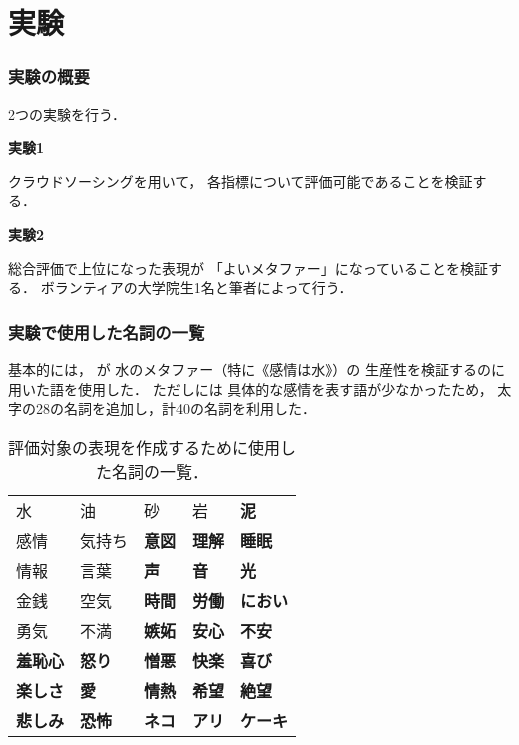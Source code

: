 \documentclass[12pt,usepdftitle=false]{beamer}
\begin{document}
\section{実験}
\begin{frame}
    \frametitle{実験の概要}

    2つの実験を行う．

    \bigskip

    \textbf{実験1}

    クラウドソーシングを用いて，
    各指標について評価可能であることを検証する．

    \bigskip

    \textbf{実験2}

    総合評価で上位になった表現が
    「よいメタファー」になっていることを検証する．
    ボランティアの大学院生1名と筆者によって行う．

\end{frame}

\begin{frame}
    \frametitle{実験で使用した名詞の一覧}
    基本的には，
    \citet{nabeshima2011}が
    水のメタファー（特に《感情は水》）の
    生産性を検証するのに用いた語を使用した．
    ただし\citet{nabeshima2011}には
    具体的な感情を表す語が少なかったため，
    太字の28の名詞を追加し，計40の名詞を利用した．

    \begin{table}
        \footnotesize
        \begin{tabular}{lllll}
            \toprule
            水 & 油 & 砂 & 岩 & \textbf{泥} \\
            感情 & 気持ち & \textbf{意図} & \textbf{理解} & \textbf{睡眠} \\
            情報 & 言葉 & \textbf{声} & \textbf{音} & \textbf{光} \\
            金銭 & 空気 & \textbf{時間} & \textbf{労働} & \textbf{におい} \\
            勇気 & 不満 & \textbf{嫉妬} & \textbf{安心} & \textbf{不安} \\
            \textbf{羞恥心}  & \textbf{怒り} & \textbf{憎悪} & \textbf{快楽} & \textbf{喜び} \\
            \textbf{楽しさ} & \textbf{愛} & \textbf{情熱} & \textbf{希望} & \textbf{絶望} \\
            \textbf{悲しみ} & \textbf{恐怖} & \textbf{ネコ} & \textbf{アリ} & \textbf{ケーキ} \\
            \bottomrule
        \end{tabular}
        \caption{評価対象の表現を作成するために使用した名詞の一覧．}
    \end{table}
\end{frame}
\end{document}
